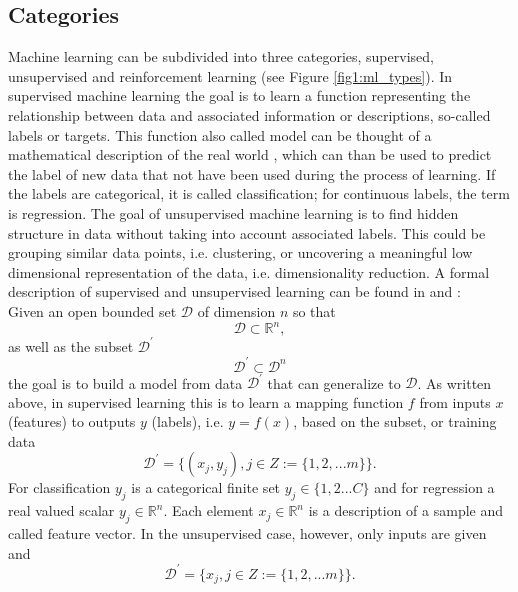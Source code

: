 \subsection{Categories}
\label{theory:ML:categories}
Machine learning can be subdivided into three categories, supervised, unsupervised and reinforcement learning (see Figure \ref{fig1:ml_types}). In supervised machine learning the goal is to learn a function representing the relationship between data and associated information or descriptions, so-called labels or targets. This function also called model can be thought of a mathematical description of the real world \cite{Brunton2019}, which can than be used to predict the label of new data that not have been used during the process of learning. If the labels are categorical, it is called classification; for continuous labels, the term is regression. The goal of unsupervised machine learning is to find hidden structure in data without taking into account associated labels. This could be grouping similar data points, i.e. clustering, or uncovering a meaningful low dimensional representation of the data, i.e. dimensionality reduction. 
A formal description of supervised and unsupervised learning can be found in \cite{Brunton_kutz_2019} and \cite{Murphy2012}:\\
Given an open bounded set \(\mathcal{D}\) of dimension \(n\) so that
\begin{equation}
    \mathcal{D}\subset\mathbb{R}^{n},
\end{equation}
as well as the subset \(\mathcal{D}^{'}\) 
\begin{equation}
    \mathcal{D}^{'}\subset\mathcal{D}^{n}
\end{equation}
the goal is to build a model from data \(\mathcal{D}^{'}\) that can generalize to \(\mathcal{D}\). As written above, in supervised learning this is to learn a mapping function \(f\) from inputs \(x\) (features) to outputs \(y\) (labels), i.e. \(y = f(x)\), based on the subset, or training data
\begin{equation}
    \mathcal{D}^{'}=\{(x_j, y_j), j \in Z := \{1,2,...m\}\}. 
\end{equation}
For classification \(y_j\) is a categorical finite set \(y_j \in \{1,2...C\}\) and for regression a real valued scalar \(y_j \in \mathbb R^{n}\). Each element \(x_j \in \mathbb R^{n}\) is a description of a sample and called feature vector.
In the unsupervised case, however, only inputs are given and 
\begin{equation}
    \mathcal{D}^{'}=\{x_j, j \in Z := \{1,2,...m\}\}. 
\end{equation}
